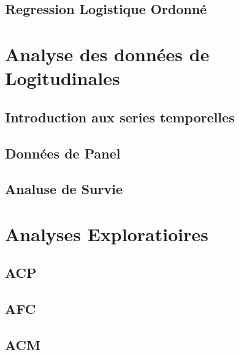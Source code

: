 \documentclass[
]{book}
\begin{document}
\hypertarget{regression-logistique-ordonnuxe9}{%
\section{Regression Logistique Ordonné}\label{regression-logistique-ordonnuxe9}}

\hypertarget{analyse-des-donnuxe9es-de-logitudinales}{%
\chapter{Analyse des données de Logitudinales}\label{analyse-des-donnuxe9es-de-logitudinales}}

\hypertarget{introduction-aux-series-temporelles}{%
\section{Introduction aux series temporelles}\label{introduction-aux-series-temporelles}}

\hypertarget{donnuxe9es-de-panel}{%
\section{Données de Panel}\label{donnuxe9es-de-panel}}

\hypertarget{analuse-de-survie}{%
\section{Analuse de Survie}\label{analuse-de-survie}}

\hypertarget{analyses-exploratioires}{%
\chapter{Analyses Exploratioires}\label{analyses-exploratioires}}

\hypertarget{acp}{%
\section{ACP}\label{acp}}

\hypertarget{afc}{%
\section{AFC}\label{afc}}

\hypertarget{acm}{%
\section{ACM}\label{acm}}

  
\end{document}
